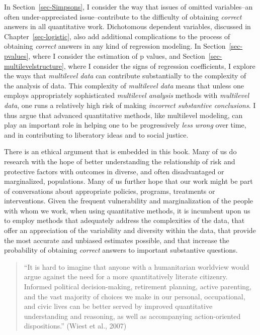 \documentclass[
  letterpaper,
  DIV=11,
  numbers=noendperiod]{scrreprt}
\begin{document}
In Section~\ref{sec-Simpsons}, I consider the way that issues of omitted
variables--an often under-appreciated issue--contribute to the
difficulty of obtaining \emph{correct} answers in all quantitative work.
Dichotomous dependent variables, discussed in
Chapter~\ref{sec-logistic}, also add additional complications to the
process of obtaining \emph{correct} answers in any kind of regression
modeling. In Section~\ref{sec-pvalues}, where I consider the estimation
of p values, and Section~\ref{sec-multilevelstructure}, where I consider
the signs of regression coefficients, I explore the ways that
\emph{multilevel data} can contribute substantially to the complexity of
the analysis of data. This complexity of \emph{multilevel data} means
that unless one employs appropriately sophisticated \emph{multilevel
analysis} methods with \emph{multilevel data}, one runs a relatively
high risk of making \emph{incorrect substantive conclusions}. I thus
argue that advanced quantitative methods, like multilevel modeling, can
play an important role in helping one to be progressively \emph{less
wrong} over time, and in contributing to liberatory ideas and to social
justice. 

There is an ethical argument that is embedded in this book. Many of us
do research with the hope of better understanding the relationship of
risk and protective factors with outcomes in diverse, and often
disadvantaged or marginalized, populations. Many of us further hope that
our work might be part of conversations about appropriate policies,
programs, treatments or interventions. Given the frequent vulnerability
and marginalization of the people with whom we work, when using
quantitative methods, it is incumbent upon us to employ methods that
adequately address the complexities of the data, that offer an
appreciation of the variability and diversity within the data, that
provide the most accurate and unbiased estimates possible, and that
increase the probability of obtaining \emph{correct} answers to
important substantive questions.

\begin{quote}
``It is hard to imagine that anyone with a humanitarian worldview would
argue against the need for a more quantitatively literate citizenry.
Informed political decision-making, retirement planning, active
parenting, and the vast majority of choices we make in our personal,
occupational, and civic lives can be better served by improved
quantitative understanding and reasoning, as well as accompanying
action-oriented dispositions.'' (Wiest et al., 2007)
\end{quote}
\end{document}
